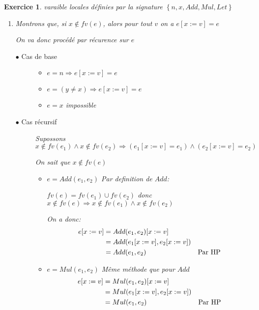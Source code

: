 \documentclass{article}
\theoremstyle{plain}
\newtheorem{exo}{Exercice}%
\begin{document}
\newpage

\begin{exo}
varaible locales définies par la signature $\left\{n, x, Add, Mul, Let\right\}$
\begin{enumerate}
\item  Montrons que, si $x \notin fv(e)$, alors pour tout $v$ on a $e[x := v] = e$

    On va donc procédé par récurence sur $e$
    \begin{description}
    \item[$\bullet$ Cas de base]
        \begin{itemize}
            \item $e = n \Rightarrow e[x := v] = e$ 
            \item $e = (y \neq x)  \Rightarrow e[x := v] = e$ 
            \item $e = x$ impossible
        \end{itemize}
                    
    \item[$\bullet$ Cas récursif] Supossons $x \notin fv(e_1)\wedge x\notin fv(e_2) \Rightarrow
        (e_1[x:=v]=e_1) \wedge (e_2[x:= v]=e_2)$

        On sait que $x\notin fv(e)$
        \begin{itemize}
        \item $e = Add(e_1,e_2)$ Par definition de $Add$:
                            
            $fv(e) = fv(e_1) \cup fv(e_2)$ donc $x \notin fv(e) 
            \Rightarrow x\notin fv(e_1) \wedge x \notin fv(e_2)$\vspace{3mm}
                            
            \hspace{1cm}On a donc:
            \begin{align*}    
                e[x:=v] &= Add(e_1,e_2)[x:=v] \\
                        &= Add(e_1[x:=v],e_2[x:=v]) \\
                        &= Add(e_1,e_2) & \textmd{Par HP}
            \end{align*}
            
        \item $e = Mul(e_1,e_2)$ Même méthode que pour $Add$
            \begin{align*}    
                e[x:=v] &= Mul(e_1,e_2)[x:=v] \\
                        &= Mul(e_1[x:=v],e_2[x:=v]) \\
                        &= Mul(e_1,e_2) & \textmd{Par HP}
            \end{align*}
            

\end{itemize}
\end{description}
\end{enumerate}
\end{exo}
\end{document}
